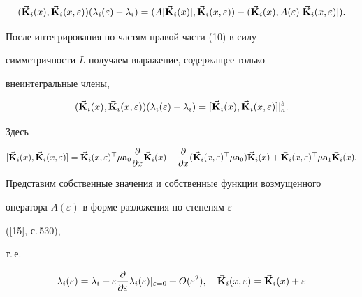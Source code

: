 \begin{pf}
\begin{equation}
(\vb{K}_i(x),\vb{K}_i(x,\varepsilon))(\lambda_i(\varepsilon)- 


\lambda_i)=(A[\vb{K}_i(x)],\vb{K}_i(x,\varepsilon))- 


(\vb{K}_i(x),A(\varepsilon)[\vb{K}_i(x,\varepsilon)]). 


\end{equation} 


После интегрирования по частям правой части (10) в силу 


симметричности $L$ получаем выражение, содержащее только 


внеинтегральные члены,


\begin{equation} 


(\vb{K}_i(x),\vb{K}_i(x,\varepsilon))(\lambda_i(\varepsilon)- 


\lambda_i)=[\vb{K}_i(x),\vb{K}_i(x,\varepsilon)]|^b_a. 


\end{equation} 


Здесь 


\begin{equation} 


[\vb{K}_i(x),\vb{K}_i(x,\varepsilon)]=\vb{K}_i(x,\varepsilon)^\top 


\mu\bold a_0\frac{\partial}{\partial x}\vb{K}_i(x)- 


\frac{\partial}{\partial x}(\vb{K}_i(x,\varepsilon)^\top 


\mu\bold a_0)\vb{K}_i(x)+\vb{K}_i(x,\varepsilon)^\top 


\mu\bold a_1\vb{K}_i(x). 


\end{equation} 


 


Представим собственные значения и собственные функции возмущенного 


оператора $A(\varepsilon)$ в форме разложения по степеням $\varepsilon$ 


([15], с.\,530), 


т.\,е. 


\begin{equation} 


\lambda_i(\varepsilon)=\lambda_i+\varepsilon 


\frac{\partial}{\partial\varepsilon}\lambda_i(\varepsilon) 


|_{\varepsilon=0}+O(\varepsilon^2),\quad 


\vb{K}_i(x,\varepsilon)=\vb{K}_i(x)+\varepsilon 



\end{equation}
\end{pf}
